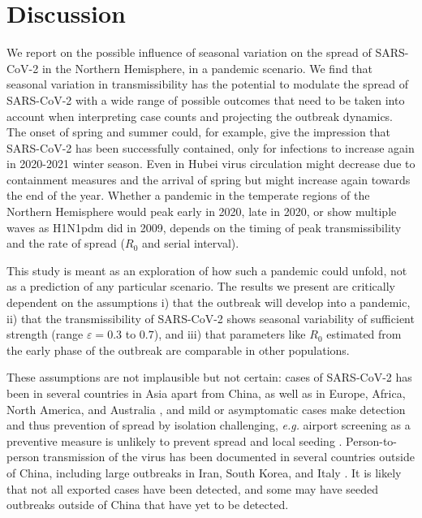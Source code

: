 \documentclass[rmp, reprint, superscriptaddress, floatfix,amsmath]{revtex4-1}
\newcommand{\forcing}{\varepsilon}
\begin{document}
\section{Discussion}

We report on the possible influence of seasonal variation on the spread of SARS-CoV-2 in the Northern Hemisphere, in a pandemic scenario. We find that seasonal variation in transmissibility has the potential to modulate the spread of SARS-CoV-2 with a wide range of possible outcomes that need to be taken into account when interpreting case counts and projecting the outbreak dynamics. 
The onset of spring and summer could, for example, give the impression that SARS-CoV-2 has been successfully contained, only for infections to increase again in 2020-2021 winter season. 
Even in Hubei virus circulation might decrease due to containment measures and the arrival of spring but might increase again towards the end of the year.
Whether a pandemic in the temperate regions of the Northern Hemisphere would peak early in 2020, late in 2020, or show multiple waves as H1N1pdm did in 2009, depends on the timing of peak transmissibility and the rate of spread ($R_0$ and serial interval).

This study is meant as an exploration of how such a pandemic could unfold, not as a prediction of any particular scenario.
The results we present are critically dependent on the assumptions
i) that the outbreak will develop into a pandemic,
ii) that the transmissibility of SARS-CoV-2 shows seasonal variability of sufficient strength (range $\forcing=0.3$ to $0.7$), and  
iii) that parameters like $R_0$ estimated from the early phase of the outbreak are comparable in other populations. 

These assumptions are not implausible but not certain: cases of SARS-CoV-2 has been in several countries in Asia apart from China, as well as in Europe, Africa, North America, and Australia \citep{WHO_situation_report50}, and mild or asymptomatic cases make detection and thus prevention of spread by isolation challenging, \textit{e.g.} airport screening as a preventive measure is unlikely to prevent spread and local seeding \citep{quilty2020effectiveness}. 
Person-to-person transmission of the virus has been documented in several countries outside of China, including large outbreaks in Iran, South Korea, and Italy \citep{WHO_situation_report50}. 
It is likely that not all exported cases have been detected, and some may have seeded outbreaks outside of China that have yet to be detected. 
\end{document}

